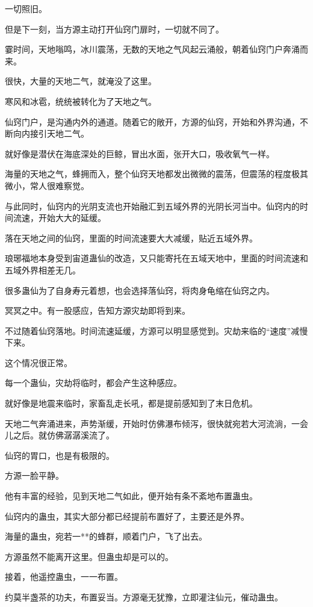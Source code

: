 \begin{this_body}
一切照旧。

但是下一刻，当方源主动打开仙窍门扉时，一切就不同了。

霎时间，天地嗡鸣，冰川震荡，无数的天地之气风起云涌般，朝着仙窍门户奔涌而来。

很快，大量的天地二气，就淹没了这里。

寒风和冰雹，统统被转化为了天地之气。

仙窍门户，是沟通内外的通道。随着它的敞开，方源的仙窍，开始和外界沟通，不断向内接引天地二气。

就好像是潜伏在海底深处的巨鲸，冒出水面，张开大口，吸收氧气一样。

海量的天地之气，蜂拥而入，整个仙窍天地都发出微微的震荡，但震荡的程度极其微小，常人很难察觉。

与此同时，仙窍内的光阴支流也开始融汇到五域外界的光阴长河当中。仙窍内的时间流速，开始大大的延缓。

落在天地之间的仙窍，里面的时间流速要大大减缓，贴近五域外界。

琅琊福地本身受到宙道蛊仙的改造，又只能寄托在五域天地中，里面的时间流速和五域外界相差无几。

很多蛊仙为了自身寿元着想，也会选择落仙窍，将肉身龟缩在仙窍之内。

冥冥之中。有一股感应，告知方源灾劫即将到来。

不过随着仙窍落地。时间流速延缓，方源可以明显感觉到。灾劫来临的“速度”减慢下来。

这个情况很正常。

每一个蛊仙，灾劫将临时，都会产生这种感应。

就好像是地震来临时，家畜乱走长吼，都是提前感知到了末日危机。

天地二气奔涌进来，声势渐缓，开始时仿佛瀑布倾泻，很快就宛若大河流淌，一会儿之后。就仿佛潺潺溪流了。

仙窍的胃口，也是有极限的。

方源一脸平静。

他有丰富的经验，见到天地二气如此，便开始有条不紊地布置蛊虫。

仙窍内的蛊虫，其实大部分都已经提前布置好了，主要还是外界。

海量的蛊虫，宛若一**的蜂群，顺着门户，飞了出去。

方源虽然不能离开这里。但蛊虫却是可以的。

接着，他遥控蛊虫，一一布置。

约莫半盏茶的功夫，布置妥当。方源毫无犹豫，立即灌注仙元，催动蛊虫。


\end{this_body}
